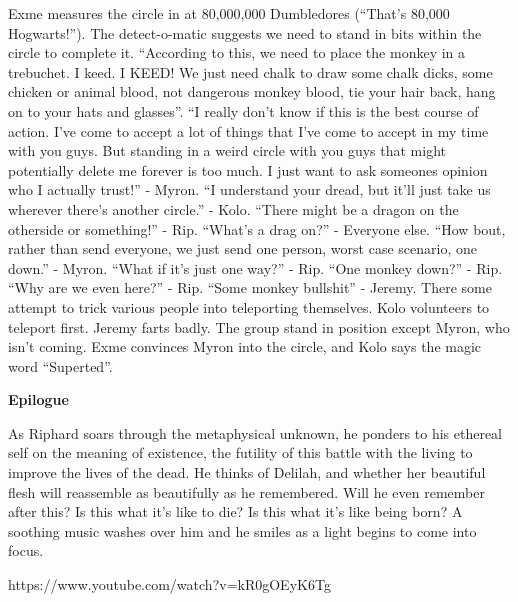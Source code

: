 \begin{multicols}{2}
Exme measures the circle in at 80,000,000 Dumbledores (“That’s 80,000 Hogwarts!”). The detect-o-matic suggests we need to stand in bits within the circle to complete it. “According to this, we need to place the monkey in a trebuchet. I keed. I KEED! We just need chalk to draw some chalk dicks, some chicken or animal blood, not dangerous monkey blood, tie your hair back, hang on to your hats and glasses''. “I really don’t know if this is the best course of action. I’ve come to accept a lot of things that I’ve come to accept in my time with you guys. But standing in a weird circle with you guys that might potentially delete me forever is too much. I just want to ask someones opinion who I actually trust!” - Myron. “I understand your dread, but it’ll just take us wherever there’s another circle.” - Kolo. “There might be a dragon on the otherside or something!” - Rip. “What’s a drag on?” - Everyone else. “How bout, rather than send everyone, we just send one person, worst case scenario, one down.” - Myron. “What if it’s just one way?” - Rip. “One monkey down?” - Rip. “Why are we even here?” - Rip. “Some monkey bullshit” - Jeremy. There some attempt to trick various people into teleporting themselves. Kolo volunteers to teleport first. Jeremy farts badly. The group stand in position except Myron, who isn’t coming. Exme convinces Myron into the circle, and Kolo says the magic word “Superted”.\medskip

\textbf{Epilogue}

As Riphard soars through the metaphysical unknown, he ponders to his ethereal self on the meaning of existence, the futility of this battle with the living to improve the lives of the dead. He thinks of Delilah, and whether her beautiful flesh will reassemble as beautifully as he remembered. Will he even remember after this? Is this what it’s like to die? Is this what it’s like being born? A soothing music washes over him and he smiles as a light begins to come into focus.\medskip

https://www.youtube.com/watch?v=kR0gOEyK6Tg


\end{multicols}

